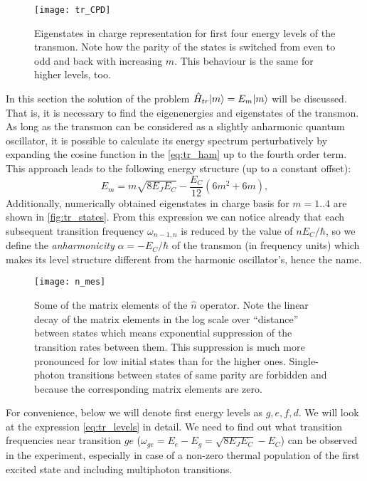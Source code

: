 \documentclass[12pt, twoside]{report}
\DeclarePairedDelimiter\ket{\lvert}{\rangle}
\numberwithin{equation}{section}
\begin{document}
\begin{figure}
\centering
\texttt{[image: tr\_CPD]}
\caption{Eigenstates in charge representation for first four energy levels of the transmon. Note how the parity of the states is switched from even to odd and back with increasing $m$. This behaviour is the same for higher levels, too.}
\label{fig:tr_states}
\end{figure}

In this section the solution of the problem $\hat H_{tr} \ket{m} = E_m \ket{m}$ will be discussed. That is, it is necessary to find the eigenenergies and eigenstates of the transmon. As long as the transmon can be considered as a slightly anharmonic quantum oscillator, it is possible to calculate its energy spectrum perturbatively by expanding the cosine function in the \eqref{eq:tr_ham} up to the fourth order term. This approach leads\cite{Koch2007} to the following energy structure (up to a constant offset):
\begin{equation}
E_m = m \sqrt{8E_J E_C} -\frac{E_C}{12}(6m^2+6m),
\label{eq:tr_levels}
\end{equation}
Additionally, numerically obtained eigenstates in charge basis for $m=1..4$ are shown in \autoref{fig:tr_states}. From this expression we can notice already that each subsequent transition frequency $\omega_{n-1,n}$ is reduced by the value of $n E_C/\hbar$, so we define the \textit{anharmonicity} $\alpha = -E_C/\hbar$ of the transmon (in frequency units) which makes its level structure different from the harmonic oscillator's, hence the name.

\begin{figure}
\centering
\texttt{[image: n\_mes]}
\caption{Some of the matrix elements of the $\hat n$ operator. Note the linear decay of the matrix elements in the log scale over ``distance'' between states which means exponential suppression of the transition rates between them. This suppression is much more pronounced for low initial states than for the higher ones. Single-photon transitions between states of same parity are forbidden and because the corresponding matrix elements are zero.}
\label{fig:n_mes}
\end{figure}


For convenience, below we will denote first energy levels as $g,e,f,d$. We will look at the expression \eqref{eq:tr_levels} in detail. We need to find out what transition frequencies near transition $ge$ ($\omega_{ge} = E_e - E_g = \sqrt{8E_J E_C} - E_C$) can be observed in the experiment, especially in case of a non-zero thermal population of the first excited state and including multiphoton transitions. 
\end{document}
